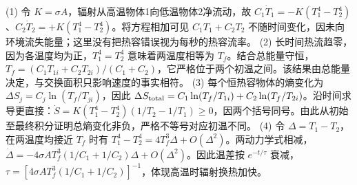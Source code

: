 (1) 令 \(K=\sigma A\)，辐射从高温物体1向低温物体2净流动，故 \(C_1\dot T_1=-K(T_1^4-T_2^4)\)、\(C_2\dot T_2=+K(T_1^4-T_2^4)\)。将方程相加可见 \(C_1T_1+C_2T_2\) 不随时间变化，因未向环境流失能量；这里没有把热容错误视为每秒的热容流率。
(2) 长时间热流趋零，因为各温度均为正，\(T_1^4=T_2^4\) 意味着两温度相等为 \(T_f\)。结合总能量守恒，\(T_f=(C_1T_{1i}+C_2T_{2i})/(C_1+C_2)\)，它严格位于两个初温之间。该结果由总能量决定，与交换面积只影响速度的事实相符。
(3) 每个恒热容物体的熵变化为 \(\Delta S_j=C_j\ln(T_f/T_{ji})\)，因此 \(\Delta S_{\rm total}=C_1\ln(T_f/T_{1i})+C_2\ln(T_f/T_{2i})\)。沿时间求导更直接：\(\dot S=K(T_1^4-T_2^4)(1/T_2-1/T_1)\ge0\)，因两个括号同号。由此从初始至最终积分证明总熵变化非负，严格不等号对应初温不同。
(4) 令 \(\Delta=T_1-T_2\)，在两温度均接近 \(T_f\) 时有 \(T_1^4-T_2^4=4T_f^3\Delta+O(\Delta^2)\)。两动力学式相减，\(\dot\Delta=-4\sigma A T_f^3(1/C_1+1/C_2)\Delta+O(\Delta^2)\)。因此温差按 \(e^{-t/\tau}\) 衰减，\(\tau=[4\sigma A T_f^3(1/C_1+1/C_2)]^{-1}\)，体现高温时辐射换热加快。
